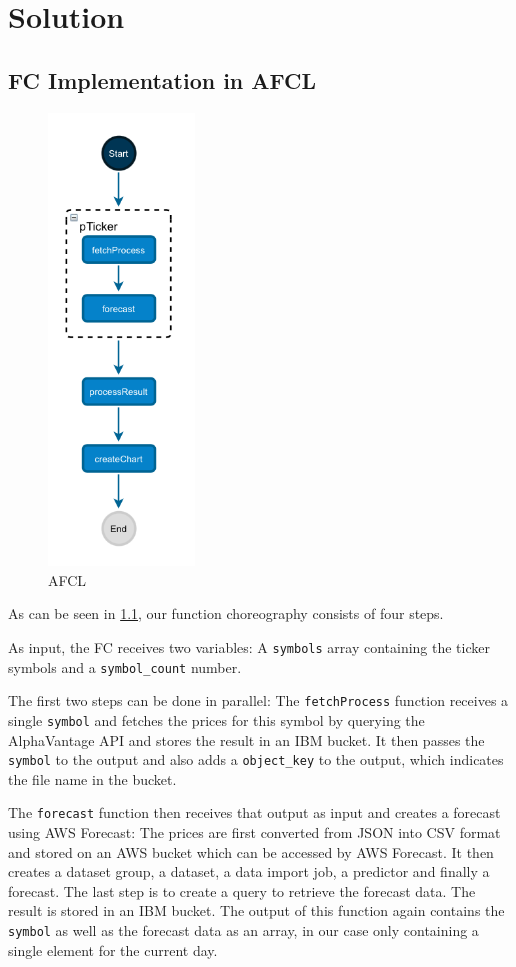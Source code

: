 \chapter{\label{chap:solution}Solution}


%
%
%
\section{FC Implementation in AFCL}


\begin{figure}[h]
  \centering
  \includegraphics[height=12cm, keepaspectratio]{./assets/afcl}
  \caption{AFCL}
  \label{fig:afcl}
\end{figure}

As can be seen in \cref{fig:afcl}, our function choreography consists of
four steps.

As input, the FC receives two variables: A \texttt{symbols} array containing
the ticker symbols and a \texttt{symbol\_count} number.

The first two steps can be done in parallel: The \texttt{fetchProcess} function
receives a single \texttt{symbol} and fetches the prices for this symbol by
querying the AlphaVantage API and stores the result in an IBM bucket. It then
passes the \texttt{symbol} to the output and also adds a \texttt{object\_key}
to the output, which indicates the file name in the bucket.

The \texttt{forecast} function then receives that output as input and creates a
forecast using AWS Forecast: The prices are first converted from JSON into CSV format
and stored on an AWS bucket which can be accessed by AWS Forecast. It then creates
a dataset group, a dataset, a data import job, a predictor and finally a forecast.
The last step is to create a query to retrieve the forecast data. The result is
stored in an IBM bucket. The output of this function again contains the \texttt{symbol}
as well as the forecast data as an array, in our case only containing a single
element for the current day.

